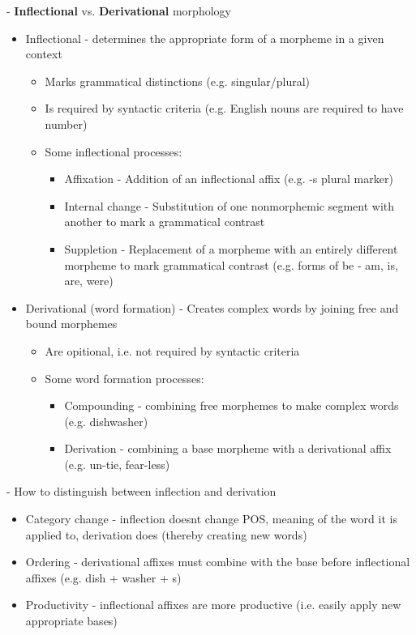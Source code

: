 \documentclass[11pt]{article}
\begin{document}
- {\bf Inflectional} vs. {\bf Derivational} morphology
\begin{itemize}
 \item Inflectional - determines the appropriate form of a morpheme in a given context
  \begin{itemize}
   \item Marks grammatical distinctions (e.g. singular/plural) 
   \item Is required by syntactic criteria (e.g. English nouns are required to have number)
   \item Some inflectional processes:
    \begin{itemize}
     \item Affixation - Addition of an inflectional affix (e.g. -s plural marker)
     \item Internal change - Substitution of one nonmorphemic segment with another to mark a grammatical contrast
     \item Suppletion - Replacement of a morpheme with an entirely different morpheme to mark grammatical contrast (e.g. forms of be - am, is, are, were)
    \end{itemize}
  \end{itemize}
 \item Derivational (word formation) - Creates complex words by joining free and bound morphemes 
  \begin{itemize}
   \item Are opitional, i.e. not required by syntactic criteria
   \item Some word formation processes:
    \begin{itemize}
     \item Compounding - combining free morphemes to make complex words (e.g. dishwasher)
     \item Derivation - combining a base morpheme with a derivational affix (e.g. un-tie, fear-less)
    \end{itemize}
  \end{itemize}
\end{itemize}
- How to distinguish between inflection and derivation
\begin{itemize}
 \item Category change - inflection doesnt change POS, meaning of the word it is applied to, derivation does (thereby creating new words)
 \item Ordering - derivational affixes must combine with the base before inflectional affixes (e.g. dish + washer + s)
 \item Productivity - inflectional affixes are more productive (i.e. easily apply new appropriate bases)
\end{itemize}
\end{document}
